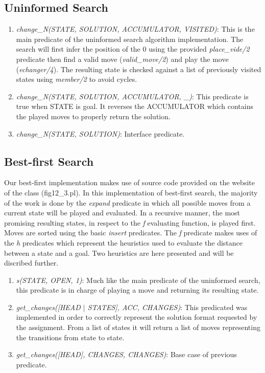\documentclass[12pt]{article}
\begin{document}
\subsection{Uninformed Search}
\begin{enumerate}[-]
\item
\textit{change\_N(STATE, SOLUTION, ACCUMULATOR, VISITED)}:
This is the main predicate of the uninformed search algorithm implementation.  The search will first infer the position of the 0 using the provided \textit{place\_vide/2} predicate then find a valid move (\textit{valid\_move/2}) and play the move (\textit{echanger/4}).  The resulting state is checked against a list of previously visited states using \textit{member/2} to avoid cycles.
\item
\textit{change\_N(STATE, SOLUTION, ACCUMULATOR, \_)}:
This predicate is true when STATE is goal. It reverses the ACCUMULATOR which contains the played moves to properly return the solution.
\item 
\textit{change\_N(STATE, SOLUTION)}:
Interface predicate.
\end{enumerate}

\subsection{Best-first Search}
Our best-first implementation makes use of source code provided on the website of the class (fig12\_3.pl).  In this implementation of best-first search, the majority of the work is done by the \textit{expand} predicate in which all possible moves from a current state will be played and evaluated.  In a recursive manner, the most promising resulting states, in respect to the \textit{f} evaluating function, is played first.  Moves are sorted using the basic \textit{insert} predicates.  The \textit{f} predicate makes uses of the \textit{h} predicates which represent the heuristics used to evaluate the distance between a state and a goal.  Two heuristics are here presented and will be discribed further.
\begin{enumerate}[-]
\item
\textit{s(STATE, OPEN, 1)}:
Much like the main predicate of the uninformed search, this predicate is in charge of playing a move and returning its resulting state.
\item
\textit{get\_changes([HEAD $\mid$ STATES], ACC, CHANGES)}:
This predicated was implemented in order to correctly represent the solution format requested by the assignment.  From a list of states it will return a list of moves representing the transitions from state to state.
\item
\textit{get\_changes([HEAD], CHANGES, CHANGES)}:
Base case of previous predicate.
\end{enumerate}
\end{document}
